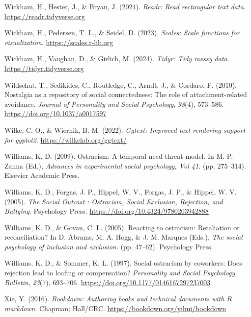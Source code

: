 \documentclass[
]{udthesis}
\newlength{\cslhangindent}
\newenvironment{CSLReferences}[2] %
 {\begin{list}{}{%
  \setlength{\itemindent}{0pt}
  \setlength{\leftmargin}{0pt}
  \setlength{\parsep}{0pt}
  \ifodd #1
   \setlength{\leftmargin}{\cslhangindent}
   \setlength{\itemindent}{-1\cslhangindent}
  \fi
  \setlength{\itemsep}{#2\baselineskip}}}
 {\end{list}}
\begin{document}
\begin{CSLReferences}{1}{0}
Wickham, H., Hester, J., \& Bryan, J. (2024). \emph{Readr: Read rectangular text data}. \url{https://readr.tidyverse.org}

Wickham, H., Pedersen, T. L., \& Seidel, D. (2023). \emph{Scales: Scale functions for visualization}. \url{https://scales.r-lib.org}

Wickham, H., Vaughan, D., \& Girlich, M. (2024). \emph{Tidyr: Tidy messy data}. \url{https://tidyr.tidyverse.org}

Wildschut, T., Sedikides, C., Routledge, C., Arndt, J., \& Cordaro, F. (2010). Nostalgia as a repository of social connectedness: {The} role of attachment-related avoidance. \emph{Journal of Personality and Social Psychology}, \emph{98}(4), 573--586. \url{https://doi.org/10.1037/a0017597}

Wilke, C. O., \& Wiernik, B. M. (2022). \emph{Ggtext: Improved text rendering support for ggplot2}. \url{https://wilkelab.org/ggtext/}

Williams, K. D. (2009). Ostracism: {A} temporal need-threat model. In M. P. Zanna (Ed.), \emph{Advances in experimental social psychology, {Vol} 41.} (pp. 275--314). {Elsevier Academic Press}.

Williams, K. D., Forgas, J. P., Hippel, W. V., Forgas, J. P., \& Hippel, W. V. (2005). \emph{The Social Outcast : Ostracism, Social Exclusion, Rejection, and Bullying}. Psychology Press. \url{https://doi.org/10.4324/9780203942888}

Williams, K. D., \& Govan, C. L. (2005). Reacting to ostracism: {Retaliation} or reconciliation? In D. Abrams, M. A. Hogg, \& J. M. Marques (Eds.), \emph{The social psychology of inclusion and exclusion.} (pp. 47--62). {Psychology Press}.

Williams, K. D., \& Sommer, K. L. (1997). Social ostracism by coworkers: Does rejection lead to loafing or compensation? \emph{Personality and Social Psychology Bulletin}, \emph{23}(7), 693--706. \url{https://doi.org/10.1177/0146167297237003}

Xie, Y. (2016). \emph{Bookdown: Authoring books and technical documents with {R} markdown}. Chapman; Hall/CRC. \url{https://bookdown.org/yihui/bookdown}


\end{CSLReferences}
\end{document}
